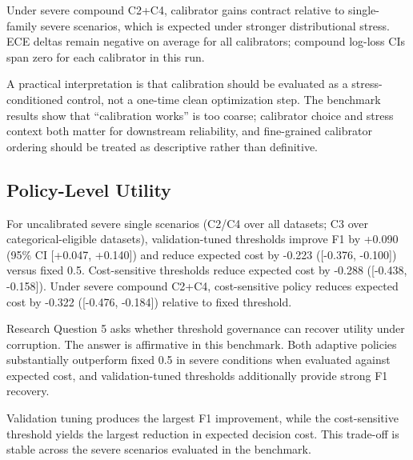 \documentclass{AuthorGuide/ijitcs}
\newcommand{\fittableinput}[1]{%
\begingroup
\setlength{\tabcolsep}{4pt}%
\resizebox{\textwidth}{!}{}%
\endgroup
}
\begin{document}
Under severe compound C2+C4, calibrator gains contract relative to single-family severe scenarios, which is expected under stronger distributional stress. ECE deltas remain negative on average for all calibrators; compound log-loss CIs span zero for each calibrator in this run.

A practical interpretation is that calibration should be evaluated as a stress-conditioned control, not a one-time clean optimization step. The benchmark results show that ``calibration works'' is too coarse; calibrator choice and stress context both matter for downstream reliability, and fine-grained calibrator ordering should be treated as descriptive rather than definitive.

\begin{table}[!t]
\caption{Calibration deltas versus uncalibrated baseline with dataset-cluster bootstrap 95\% CIs (\(n=12\) clusters), from \texttt{../results/tables/table\_calibration\_comparison\_severe.csv}. Single-severe rows pool C2/C4 on all datasets and C3 on categorical-eligible datasets only; compound rows use C2+C4 at (0.4,0.4). The table reports explicit cluster counts (\(n_{\mathrm{single,cl}}\), \(n_{\mathrm{compound,cl}}\)) per calibrator. Negative $\Delta$ECE / $\Delta$ log-loss indicates improvement versus uncalibrated baseline.\label{tab:calibtable}}
\small
\fittableinput{../results/tables/table_calibration_comparison_severe.tex}
\end{table}

\subsection{Policy-Level Utility}
For uncalibrated severe single scenarios (C2/C4 over all datasets; C3 over categorical-eligible datasets), validation-tuned thresholds improve F1 by +0.090 (95\% CI [+0.047, +0.140]) and reduce expected cost by -0.223 ([-0.376, -0.100]) versus fixed 0.5. Cost-sensitive thresholds reduce expected cost by -0.288 ([-0.438, -0.158]). Under severe compound C2+C4, cost-sensitive policy reduces expected cost by -0.322 ([-0.476, -0.184]) relative to fixed threshold.

Research Question 5 asks whether threshold governance can recover utility under corruption. The answer is affirmative in this benchmark. Both adaptive policies substantially outperform fixed 0.5 in severe conditions when evaluated against expected cost, and validation-tuned thresholds additionally provide strong F1 recovery.

Validation tuning produces the largest F1 improvement, while the cost-sensitive threshold yields the largest reduction in expected decision cost. This trade-off is stable across the severe scenarios evaluated in the benchmark.
\end{document}
